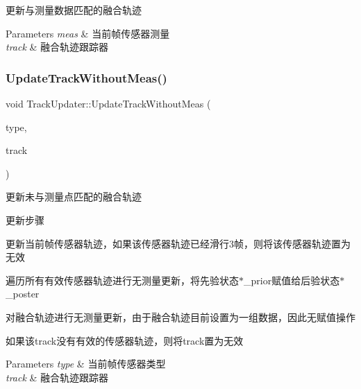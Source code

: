 更新与测量数据匹配的融合轨迹 


\begin{DoxyParams}{Parameters}
{\em meas} & 当前帧传感器测量 \\
\hline
{\em track} & 融合轨迹跟踪器 \\
\hline
\end{DoxyParams}
\mbox{\label{classTrackUpdater_a6ab3af29b364ede418503a23e125cbbf}} 
\subsubsection{\texorpdfstring{Update\+Track\+Without\+Meas()}{UpdateTrackWithoutMeas()}}
{\footnotesize\ttfamily void Track\+Updater\+::\+Update\+Track\+Without\+Meas (\begin{DoxyParamCaption}\item[{const Sensor\+Type}]{type,  }\item[{Fusion\+Track \&}]{track }\end{DoxyParamCaption})\hspace{0.3cm}{\ttfamily [private]}}



更新未与测量点匹配的融合轨迹 

更新步骤
\begin{DoxyEnumerate}
\item 更新当前帧传感器轨迹，如果该传感器轨迹已经滑行3帧，则将该传感器轨迹置为无效
\item 遍历所有有效传感器轨迹进行无测量更新，将先验状态$\ast$\+\_\+prior赋值给后验状态$\ast$\+\_\+poster
\item 对融合轨迹进行无测量更新，由于融合轨迹目前设置为一组数据，因此无赋值操作
\item 如果该track没有有效的传感器轨迹，则将track置为无效 
\begin{DoxyParams}{Parameters}
{\em type} & 当前帧传感器类型 \\
\hline
{\em track} & 融合轨迹跟踪器 \\
\hline
\end{DoxyParams}

\end{DoxyEnumerate}\mbox{\label{classTrackUpdater_acc0d0b3a043fb6e011f0a4432d266916}} 
